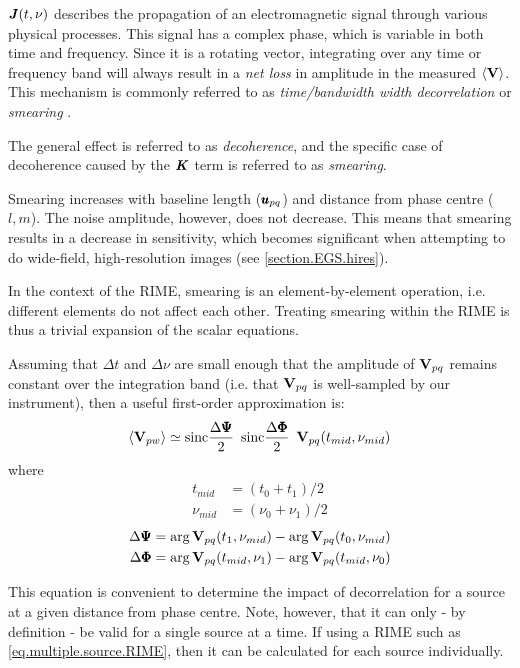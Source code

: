 \pg
$\textbf{\emph{J}}(t,\nu)$ describes the propagation of an electromagnetic signal through various physical processes. This signal has a complex phase, which is variable in both time and frequency. Since it is a rotating vector, integrating over any time or frequency band will always result in a \emph{net loss} in amplitude in the measured $\langle\textbf{V}\rangle$. This mechanism is commonly referred to as \emph{time/bandwidth width decorrelation} or \emph{smearing} .

\pg
The general effect is referred to as \emph{decoherence}, and the specific case of decoherence caused by the $\textbf{\emph{K}}$ term is referred to as \emph{smearing}.

\pg Smearing increases with baseline length ($\pmb{u}_{pq}$) and distance from phase centre ($l,m$). The noise amplitude, however, does not decrease. This means that smearing results in a decrease in sensitivity, which becomes significant when attempting to do wide-field, high-resolution images (see \cref{section.EGS.hires}).

\pg 
In the context of the RIME, smearing is an element-by-element operation, i.e. different elements do not affect each other. Treating smearing within the RIME is thus a trivial expansion of the scalar equations.

\pg
Assuming that $\Delta t$ and $\Delta \nu$ are small enough that the amplitude of $\textbf{V}_{pq}$ remains constant over the integration band (i.e. that $\textbf{V}_{pq}$ is well-sampled by our instrument), then a useful first-order approximation is:
\begin{equation}
\langle \textbf{V}_{pw} \rangle \simeq \text{sinc}\frac{\Delta \pmb{\Psi}}{2} \enskip \text{sinc}\frac{\Delta \pmb{\Phi}}{2} \enskip \textbf{V}_{pq}(t_{mid},\nu_{mid})
\end{equation}
where
\begin{align}
t_{mid}           &= (t_0 + t_1)/2\\
\nu_{mid}         &= (\nu_0 + \nu_1)/2
\end{align}
\begin{align}
\Delta \pmb{\Psi} &= \arg \textbf{V}_{pq}(t_1,\nu_{mid}) - \arg \textbf{V}_{pq}(t_0, \nu_{mid})\\
\Delta \pmb{\Phi} &= \arg \textbf{V}_{pq}(t_{mid},\nu_1) - \arg \textbf{V}_{pq}(t_{mid}, \nu_0)
\end{align}

\pg
This equation is convenient to determine the impact of decorrelation for a source at a given distance from phase centre. Note, however, that it can only - by definition - be valid for a single source at a time. If using a RIME such as \cref{eq.multiple.source.RIME}, then it can be calculated for each source individually.

